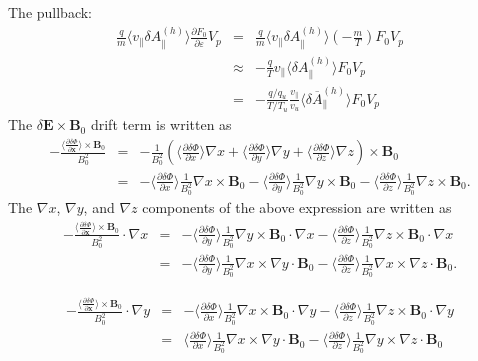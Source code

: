 \documentclass{llncs}
\begin{document}
The pullback:
\begin{eqnarray*}
  \frac{q}{m} \langle v_{\parallel} \delta A_{\parallel}^{(h)} \rangle
  \frac{\partial F_0}{\partial \varepsilon} V_p & = & \frac{q}{m} \langle
  v_{\parallel} \delta A_{\parallel}^{(h)} \rangle \left( - \frac{m}{T}
  \right) F_0 V_p\\
  & \approx & - \frac{q}{T} v_{\parallel} \langle \delta A_{\parallel}^{(h)}
  \rangle F_0 V_p\\
  & = & - \frac{q / q_u}{T / T_u} \frac{v_{\parallel}}{v_u} \langle \delta
  \overline{A}_{\parallel}^{(h)} \rangle F_0 V_p
\end{eqnarray*}
The $\delta \mathbf{E} \times \mathbf{B}_0$ drift term is written as
\begin{eqnarray*}
  - \frac{\langle \frac{\partial \delta \Phi}{\partial \mathbf{x}} \rangle
  \times \mathbf{B}_0}{B_0^2} & = & - \frac{1}{B_0^2} \left( \langle
  \frac{\partial \delta \Phi}{\partial x} \rangle \nabla x + \langle
  \frac{\partial \delta \Phi}{\partial y} \rangle \nabla y + \langle
  \frac{\partial \delta \Phi}{\partial z} \rangle \nabla z \right) \times
  \mathbf{B}_0\\
  & = & - \langle \frac{\partial \delta \Phi}{\partial x} \rangle
  \frac{1}{B_0^2} \nabla x \times \mathbf{B}_0 - \langle \frac{\partial \delta
  \Phi}{\partial y} \rangle \frac{1}{B_0^2} \nabla y \times \mathbf{B}_0 -
  \langle \frac{\partial \delta \Phi}{\partial z} \rangle \frac{1}{B_0^2}
  \nabla z \times \mathbf{B}_0 .
\end{eqnarray*}
The $\nabla x$, $\nabla y$, and $\nabla z$ components of the above expression
are written as
\begin{eqnarray}
  - \frac{\langle \frac{\partial \delta \Phi}{\partial \mathbf{x}} \rangle
  \times \mathbf{B}_0}{B_0^2} \cdot \nabla x & = & - \langle \frac{\partial
  \delta \Phi}{\partial y} \rangle \frac{1}{B_0^2} \nabla y \times
  \mathbf{B}_0 \cdot \nabla x - \langle \frac{\partial \delta \Phi}{\partial
  z} \rangle \frac{1}{B_0^2} \nabla z \times \mathbf{B}_0 \cdot \nabla x
  \nonumber\\
  & = & - \langle \frac{\partial \delta \Phi}{\partial y} \rangle
  \frac{1}{B_0^2} \nabla x \times \nabla y \cdot \mathbf{B}_0 - \langle
  \frac{\partial \delta \Phi}{\partial z} \rangle \frac{1}{B_0^2} \nabla x
  \times \nabla z \cdot \mathbf{B}_0 . 
\end{eqnarray}

\begin{eqnarray}
  - \frac{\langle \frac{\partial \delta \Phi}{\partial \mathbf{x}} \rangle
  \times \mathbf{B}_0}{B_0^2} \cdot \nabla y & = & - \langle \frac{\partial
  \delta \Phi}{\partial x} \rangle \frac{1}{B_0^2} \nabla x \times
  \mathbf{B}_0 \cdot \nabla y - \langle \frac{\partial \delta \Phi}{\partial
  z} \rangle \frac{1}{B_0^2} \nabla z \times \mathbf{B}_0 \cdot \nabla y
  \nonumber\\
  & = & \langle \frac{\partial \delta \Phi}{\partial x} \rangle
  \frac{1}{B_0^2} \nabla x \times \nabla y \cdot \mathbf{B}_0 - \langle
  \frac{\partial \delta \Phi}{\partial z} \rangle \frac{1}{B_0^2} \nabla y
  \times \nabla z \cdot \mathbf{B}_0 
\end{eqnarray}
\end{document}
